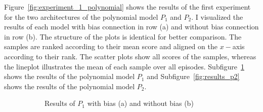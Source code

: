 Figure~\ref{fig:experiment_1_polynomial} shows the results of the first experiment for the two architectures of the polynomial model $P_1$ and $P_2$. I visualized the results of each model with bias connection in row (a) and without bias connection in row (b). The structure of the plots is identical for better comparison. The samples are ranked according to their mean score and aligned on the $x-$axis according to their rank. The scatter plots show all scores of the samples, whereas the lineplot illustrates the mean of each sample over all episodes.
Subfigure~\ref{fig:results_p1} shows the results of the polynomial model $P_1$ and Subfigure~\ref{fig:results_p2} shows the results of the polynomial model $P_2$.
\begin{figure}[!ht]
\begin{subfigure}{\textwidth}
\begin{figrow}
\item \label{row:P1_with_bias} 
\item \label{row:P1_without_bias}  
\end{figrow}
\vspace*{-5mm}
\caption{Results of $P_1$ with bias (a) and without bias (b)}
\label{fig:results_p1}
\end{subfigure}
\begin{subfigure}{\textwidth}
\begin{figrow}
\item \label{row:P2_with_bias} 
\item \label{row:P2_without_bias}  
\end{figrow}
\end{subfigure}
\end{figure}
